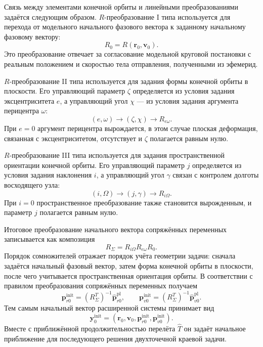 Связь между элементами конечной орбиты и линейными преобразованиями задаётся следующим образом. \(R\)-преобразование I типа используется для перехода от модельного начального фазового вектора к заданному начальному фазовому вектору:
\begin{equation}
	R_0=R(\mathbf r_0,\mathbf v_0).
\end{equation}
Это преобразование отвечает за согласование модельной круговой постановки с реальным положением и скоростью тела отправления, полученными из эфемерид.

\(R\)-преобразование II типа используется для задания формы конечной орбиты в плоскости. Его управляющий параметр \(\zeta\) определяется из условия задания эксцентриситета \(e\), а управляющий угол \(\chi\) --- из условия задания аргумента перицентра \(\omega\):
\begin{equation}
	(e,\omega)
	\longrightarrow
	(\zeta,\chi)
	\longrightarrow
	R_{e\omega}.
\end{equation}
При \(e=0\) аргумент перицентра вырождается, в этом случае плоская деформация, связанная с эксцентриситетом, отсутствует и \(\zeta\) полагается равным нулю.

\(R\)-преобразование III типа используется для задания пространственной ориентации конечной орбиты. Его управляющий параметр \(j\) определяется из условия задания наклонения \(i\), а управляющий угол \(\gamma\) связан с контролем долготы восходящего узла:
\begin{equation}
	(i,\Omega)
	\longrightarrow
	(j,\gamma)
	\longrightarrow
	R_{i\Omega}.
\end{equation}
При \(i=0\) пространственное преобразование также становится вырожденным, и параметр \(j\) полагается равным нулю.

Итоговое преобразование начального вектора сопряжённых переменных записывается как композиция
\begin{equation}
	R_{\Sigma}
	=
	R_{i\Omega}
	R_{e\omega}
	R_0 .
\end{equation}
Порядок сомножителей отражает порядок учёта геометрии задачи: сначала задаётся начальный фазовый вектор, затем форма конечной орбиты в плоскости, после чего учитывается пространственная ориентация орбиты. В соответствии с правилом преобразования сопряжённых переменных получаем
\begin{equation}
	\mathbf p_{r0}^{\mathrm{init}}
	=
	(R_{\Sigma}^{T})^{-1}
	\widehat{\mathbf p}_{r0}^{\mathrm{pl}},
	\qquad
	\mathbf p_{v0}^{\mathrm{init}}
	=
	(R_{\Sigma}^{T})^{-1}
	\widehat{\mathbf p}_{v0}^{\mathrm{pl}}.
\end{equation}
Тем самым начальный вектор расширенной системы принимает вид
\begin{equation}
	\mathbf y_0^{\mathrm{init}}
	=
	\left(
	\mathbf r_0,
	\mathbf v_0,
	\mathbf p_{r0}^{\mathrm{init}},
	\mathbf p_{v0}^{\mathrm{init}}
	\right).
\end{equation}
Вместе с приближённой продолжительностью перелёта \(\widehat T\) он задаёт начальное приближение для последующего решения двухточечной краевой задачи.

